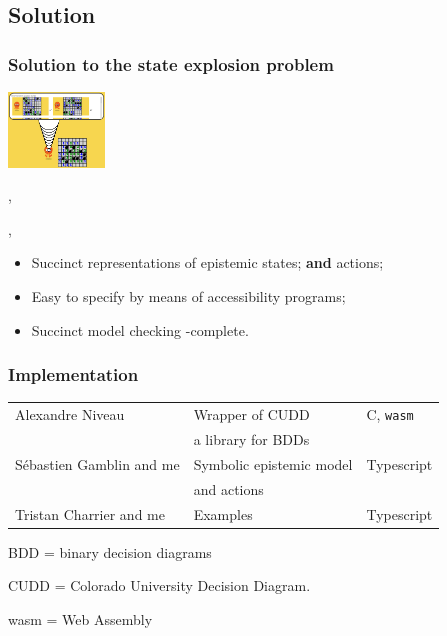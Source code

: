 \subsection{Solution}

\begin{frame}
\frametitle{Solution to the state explosion problem}

\begin{center}
	\includegraphics[height=2cm]{images/HW_minesweeper_easy.png}
\end{center}

\vfill
{}, 

\vfill
\begin{block}{ , }
	\begin{itemize}
		\item Succinct representations of epistemic states; \textbf{and} actions;
		\item Easy to specify by means of accessibility programs;
		\item Succinct model checking \PSPACE-complete.
	\end{itemize}
\end{block}

\end{frame}



\begin{frame}
	\frametitle{Implementation}

	\begin{tabular}{lll}
		Alexandre Niveau & Wrapper of CUDD & C, \texttt{wasm} \\
		 & a library for BDDs & \\[2mm] \hline
		 
		 Sébastien Gamblin and me & Symbolic epistemic model & Typescript \\
		  &  and actions  &  \\[2mm]  \hline
		 
		 Tristan Charrier and me & Examples & Typescript
		 
	\end{tabular}
	
	
	
\vfill
\hfill
	\begin{minipage}{7cm}
		\small
	BDD = binary decision diagrams
	
	CUDD = Colorado University Decision Diagram.
	
	wasm = Web Assembly
	\end{minipage}
\end{frame}







